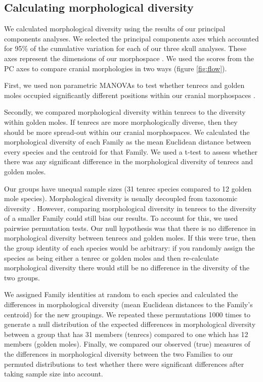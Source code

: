 \documentclass[12pt,a4paper]{article}
\begin{document}

	
\subsection{Calculating morphological diversity}

	We calculated morphological diversity using the results of our principal components analyses. We selected the principal components axes which accounted for 95\% of the cumulative variation for each of our three skull analyses. These axes represent the dimensions of our morphospace \citep{Polly2013}. We used the scores from the PC axes to compare cranial morphologies in two ways (figure \ref{fig:flow}).
	
	First, we used non parametric MANOVAs \citep{Anderson2001} to test whether tenrecs and golden moles occupied significantly different positions within our cranial morphospaces \citep[e.g][]{Serb2011, Ruta2013}.
	
	Secondly, we compared morphological diversity within tenrecs to the diversity within golden moles. If tenrecs are more morphologically diverse, then they should be more spread-out within our cranial morphospaces. We calculated the morphological diversity of each Family as the mean Euclidean distance between every species and the centroid for that Family. We used a t-test to assess whether there was any significant difference in the morphological diversity of tenrecs and golden moles.
	
	Our groups have unequal sample sizes (31 tenrec species compared to 12 golden mole species). Morphological diversity is usually decoupled from taxonomic diversity \citep[e.g.][]{Ruta2013, Hopkins2013}. However, comparing morphological diversity in tenrecs to the diversity of a smaller Family could still bias our results. To account for this, we used pairwise permutation tests. Our null hypothesis was that there is no difference in morphological diversity between tenrecs and golden moles. If this were true, then the group identity of each species would be arbitrary: if you randomly assign the species as being either a tenrec or golden moles and then re-calculate morphological diversity there would still be no difference in the diversity of the two groups. 
	
	We assigned Family identities at random to each species and calculated the differences in morphological diversity (mean Euclidean distances to the Family's centroid) for the new groupings. We repeated these permutations 1000 times to generate a null distribution of the expected differences in morphological diversity between a group that has 31 members (tenrecs) compared to one which has 12 members (golden moles). Finally, we compared our observed (true) measures of the differences in morphological diversity between the two Families to our permuted distributions to test whether there were significant differences after taking sample size into account.
	
\end{document}
